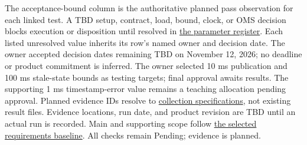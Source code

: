 The acceptance-bound column is the authoritative planned pass observation for
each linked test. A TBD setup, contract, load, bound, clock, or OMS decision
blocks execution or disposition until resolved in
\hyperref[Table:RequirementParameters]{the parameter register}. Each listed
unresolved value inherits its row's named owner and decision date. The owner
accepted decision dates remaining TBD on November 12, 2026; no deadline or
product commitment is inferred. The owner selected 10 ms publication and 100 ms stale-state bounds as testing targets; final approval awaits results. The supporting 1 ms timestamp-error value remains a teaching allocation pending approval. Planned evidence IDs resolve to
\hyperref[Table:PlannedVerificationEvidence]{collection specifications},
not existing result files. Evidence locations, run date, and product revision
are TBD until an actual run is recorded.
Main and supporting scope follow \hyperref[Table:MainBaseline]{the selected requirements baseline}. All checks remain Pending; evidence is planned.
